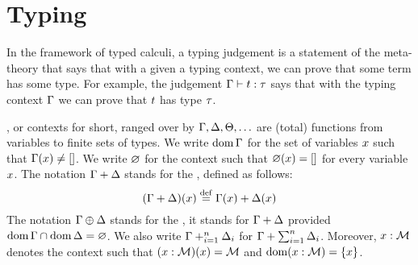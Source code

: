 \section{Typing}

In the framework of typed calculi, a typing judgement is a statement of the meta-theory that says that
with a given a typing context, we can prove that some term has some type.
For example, the judgement $\Gamma \vdash t : \tau$ says that with the typing context
$\Gamma$ we can prove that $t$ has type $\tau$.

, or contexts for short,
ranged over by $\Gamma,\Delta,\Theta,\hdots$ are (total) functions from variables to finite sets of types.
We write $\operatorname{dom}\Gamma$ for the set of variables $x$ such that $\Gamma(x) \neq []$.
We write $\varnothing$ for the context such that $\varnothing(x) = []$ for every variable $x$.
The notation $\Gamma + \Delta$ stands for the , defined as follows:
\[
    (\Gamma + \Delta)(x) \overset{\mathrm{def}}{=} \Gamma(x) + \Delta(x)
\]
The notation $\Gamma \oplus \Delta$ stands for the ,
\ie it stands for $\Gamma + \Delta$ provided $\operatorname{dom}\Gamma \cap \operatorname{dom}\Delta = \varnothing$.
We also write $\Gamma +_{i=1}^{n} \Delta_i$ for $\Gamma + \sum_{i=1}^{n} \Delta_i$.
Moreover, $x : \mathcal{M}$ denotes the context such that $(x : \mathcal{M})(x) = \mathcal{M}$
and $\operatorname{dom}(x : \mathcal{M}) = \{x\}$.

